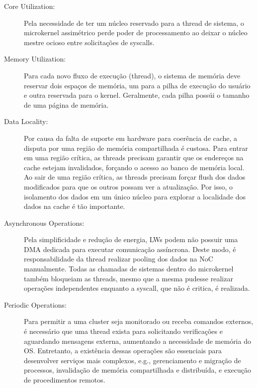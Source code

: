 	\begin{description}

		\item[Core Utilization:] Pela necessidade de ter um núcleo reservado
			para a thread de sistema, o microkernel assimétrico perde poder
			de processamento ao deixar o núcleo mestre ocioso entre
			solicitações de syscalls.

		\item[Memory Utilization:] Para cada novo fluxo de execução (thread),
			o sistema de memória deve reservar dois espaços de memória, um
			para a pilha de execução do usuário e outra reservada para
			o kernel. Geralmente, cada pilha possúi o tamanho de uma página de
			memória.
	
		\item[Data Locality:] Por causa da falta de suporte em hardware para
			coerência de cache, a disputa por uma região de memória
			compartilhada é custosa. Para entrar em uma região crítica, as
			threads precisam garantir que os endereços na cache estejam
			invalidados, forçando o acesso ao banco de memória local. Ao sair
			de uma região crítica, as threads precisam forçar flush dos
			dados modificados para que os outros possam ver a atualização.
			Por isso, o isolamento dos dados em um único núcleo para explorar
			a localidade dos dados na cache é tão importante.

		\item[Asynchronous Operations:] Pela simplificidade e redução de
			energia, LWs podem não possuir uma DMA dedicada para executar
			comunicação assíncrona. Deste modo, é responsabilidade da thread
			realizar pooling dos dados na NoC manualmente. Todas as chamadas de
			sistemas dentro do microkernel também bloqueiam as threads, mesmo que
			a mesma pudesse realizar operações independentes enquanto a syscall,
			que não é critica, é realizada.

		\item[Periodic Operations:] Para permitir a uma cluster seja monitorado
			ou receba comandos externos, é necessário que uma thread exista para
			solicitando verificações e aguardando mensagens externa, aumentando
			a necessidade de memória do OS. Entretanto, a existência dessas
			operações são essenciais para desenvolver serviços mais complexos,
			e.g., gerenciamento e migração de processos, invalidação de memória
			compartilhada e distribuída, e execução de procedimentos remotos.

	\end{description}
